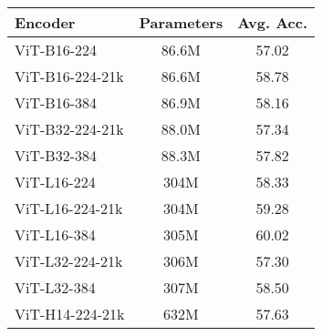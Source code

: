 \begin{tabular}{l c c }
\toprule
\textbf{Encoder} & \textbf{Parameters} & \textbf{Avg. Acc.} \\ \midrule
ViT-B16-224 & 86.6M & 57.02\\
ViT-B16-224-21k & 86.6M & 58.78\\
ViT-B16-384 & 86.9M & 58.16\\
ViT-B32-224-21k & 88.0M & 57.34\\
ViT-B32-384 & 88.3M & 57.82\\
ViT-L16-224 & 304M & 58.33\\
ViT-L16-224-21k & 304M & 59.28\\
ViT-L16-384 & 305M & 60.02\\
ViT-L32-224-21k & 306M & 57.30\\
ViT-L32-384 & 307M & 58.50\\
ViT-H14-224-21k & 632M & 57.63\\
\bottomrule
\end{tabular}
